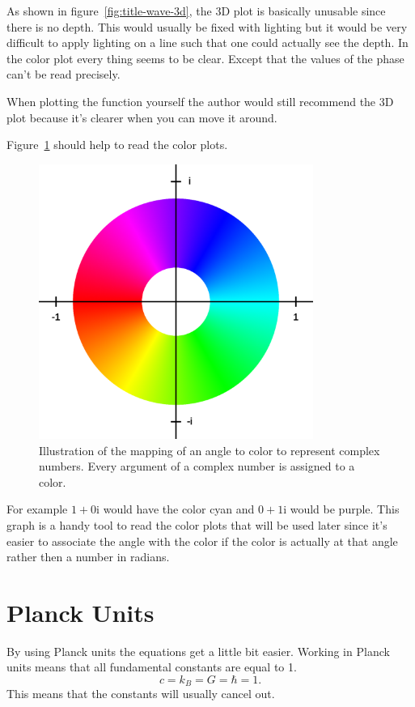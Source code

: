 \documentclass[11pt,DIV=10,final]{scrreprt} %
\newcommand{\mi}{{\text{i}}}
\begin{document}
\pagebreak[4]
As shown in figure~\ref{fig:title-wave-3d}, the 3D plot is basically unusable since there is no depth. This would usually be fixed with lighting but it would be very difficult to apply lighting on a line
such that one could actually see the depth. In the color plot every thing seems to be clear. Except that the values of the phase can't be read precisely.

When plotting the function yourself the author would still recommend the 3D plot because it's clearer when you can move it around.

Figure~\ref{fig:color-to-phase-circle} should help to read the color plots.
\begin{figure}[H]
  \centering
  \includegraphics[width=0.8\textwidth]{plots/color_circle.png}
  \caption{Illustration of the mapping of an angle to color to represent complex numbers. Every argument of a complex number is assigned to a color.}\label{fig:color-to-phase-circle}
\end{figure}
For example $1 + 0 \mi$ would have the color cyan and $0 + 1 \mi$ would be purple.
This graph is a handy tool to read the color plots that will be used later since it's easier to associate the angle with the color if the color is actually at that angle
rather then a number in radians.

\section{Planck Units}
By using Planck units the equations get a little bit easier.
Working in Planck units means that all fundamental constants are equal to 1.
\[
  c = k_{B} = G = \hbar = 1.
\]
This means that the constants will usually cancel out.
\end{document}
